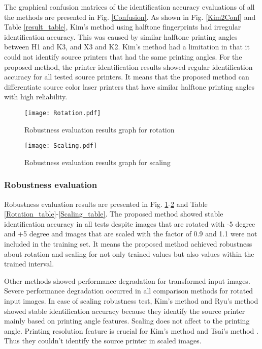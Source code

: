 \documentclass[5p, times]{elsarticle}
\begin{document}
The graphical confusion matrices of the identification accuracy evaluations of all the methods are presented in Fig. \ref{Confusion}. As shown in Fig. \ref{Kim2Conf} and Table \ref{result_table}, Kim's method using halftone fingerprints had irregular identification accuracy. This was caused by similar halftone printing angles between H1 and K3, and X3 and K2. Kim's method had a limitation in that it could not identify source printers that had the same printing angles. For the proposed method, the printer identification results showed regular identification accuracy for all tested source printers. It means that the proposed method can differentiate source color laser printers that have similar halftone printing angles with high reliability.

\begin{figure}[t]
    \centerline{\texttt{[image: Rotation.pdf]}}
    \caption{Robustness evaluation results graph for rotation
    } \label{Rotation}
\end{figure}


\begin{figure}[t]
    \centerline{\texttt{[image: Scaling.pdf]}}
    \caption{Robustness evaluation results graph for scaling
    } \label{Scaling}
\end{figure}

\subsubsection{Robustness evaluation}
Robustness evaluation results are presented in Fig. \ref{Rotation}-\ref{Scaling} and Table \ref{Rotation_table}-\ref{Scaling_table}. The proposed method showed stable identification accuracy in all tests despite images that are rotated with -5 degree and +5 degree and images that are scaled with the factor of 0.9 and 1.1 were not included in the training set. It means the proposed method achieved robustness about rotation and scaling for not only trained values but also values within the trained interval.

Other methods showed performance degradation for transformed input images. Severe performance degradation occurred in all comparison methods for rotated input images. In case of scaling robustness test, Kim's method \cite{Kim1} and Ryu's method \cite{Ryu} showed stable identification accuracy because they identify the source printer mainly based on printing angle features. Scaling does not affect to the printing angle. Printing resolution feature is crucial for Kim's method \cite{Kim2} and Tsai's method \cite{Tsai1}. Thus they couldn’t identify the source printer in scaled images.
\end{document}
